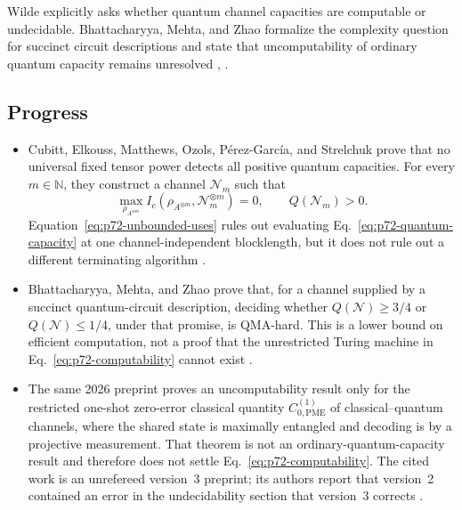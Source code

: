 Wilde explicitly asks whether quantum channel capacities are computable or
undecidable.  Bhattacharyya, Mehta, and Zhao formalize the complexity question
for succinct circuit descriptions and state that uncomputability of ordinary
quantum capacity remains unresolved
,
.

\subsection*{Progress}

\begin{itemize}
  \item Cubitt, Elkouss, Matthews, Ozols, P\'erez-Garc\'ia, and Strelchuk prove
  that no universal fixed tensor power detects all positive quantum
  capacities.  For every $m\in\mathbb N$, they construct a channel
  $\mathcal N_m$ such that
  \begin{equation}
    \max_{\rho_{A^{\otimes m}}}
      I_c(\rho_{A^{\otimes m}},\mathcal N_m^{\otimes m})=0,
    \qquad
    Q(\mathcal N_m)>0.
    \label{eq:p72-unbounded-uses}
  \end{equation}
  Equation~\eqref{eq:p72-unbounded-uses} rules out evaluating
  Eq.~\eqref{eq:p72-quantum-capacity} at one channel-independent blocklength,
  but it does not rule out a different terminating algorithm
  .

  \item Bhattacharyya, Mehta, and Zhao prove that, for a channel supplied by a
  succinct quantum-circuit description, deciding whether
  $Q(\mathcal N)\geq3/4$ or $Q(\mathcal N)\leq1/4$, under that promise, is
  QMA-hard.  This is a lower bound on efficient computation, not a proof that
  the unrestricted Turing machine in Eq.~\eqref{eq:p72-computability} cannot
  exist .

  \item The same 2026 preprint proves an uncomputability result only for the
  restricted one-shot zero-error classical quantity
  $C^{(1)}_{0,\mathrm{PME}}$ of classical--quantum channels, where the shared
  state is maximally entangled and decoding is by a projective measurement.
  That theorem is not an ordinary-quantum-capacity result and therefore does
  not settle Eq.~\eqref{eq:p72-computability}.  The cited work is an
  unrefereed version~3 preprint; its authors report that version~2 contained
  an error in the undecidability section that version~3 corrects
  .
\end{itemize}


